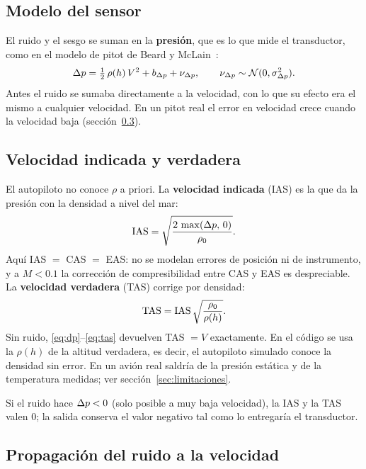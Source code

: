 \documentclass[11pt,a4paper]{article}
\begin{document}
\subsection{Modelo del sensor}

El ruido y el sesgo se suman en la \textbf{presión}, que es lo que mide el
transductor, como en el modelo de pitot de Beard y McLain~\cite{beard}:
\begin{equation}
  \Delta p = \tfrac12\,\rho(h)\,V^2 + b_{\Delta p} + \nu_{\Delta p},
  \qquad \nu_{\Delta p} \sim \mathcal{N}(0, \sigma_{\Delta p}^2).
  \label{eq:dp}
\end{equation}
Antes el ruido se sumaba directamente a la velocidad, con lo que su efecto era
el mismo a cualquier velocidad. En un pitot real el error en velocidad crece
cuando la velocidad baja (sección~\ref{sec:prop}).

\subsection{Velocidad indicada y verdadera}

El autopiloto no conoce $\rho$ a priori. La \textbf{velocidad indicada} (IAS)
es la que da la presión con la densidad a nivel del mar:
\begin{equation}
  \text{IAS} = \sqrt{\frac{2\,\max(\Delta p,\,0)}{\rho_0}} .
  \label{eq:ias}
\end{equation}
Aquí IAS $=$ CAS $=$ EAS: no se modelan errores de posición ni de instrumento,
y a $M < 0.1$ la corrección de compresibilidad entre CAS y EAS es despreciable.
La \textbf{velocidad verdadera} (TAS) corrige por densidad:
\begin{equation}
  \text{TAS} = \text{IAS}\,\sqrt{\frac{\rho_0}{\rho(h)}} .
  \label{eq:tas}
\end{equation}
Sin ruido, \eqref{eq:dp}--\eqref{eq:tas} devuelven TAS $= V$ exactamente.
En el código se usa la $\rho(h)$ de la altitud verdadera, es decir, el
autopiloto simulado conoce la densidad sin error. En un avión real saldría de
la presión estática y de la temperatura medidas; ver
sección~\ref{sec:limitaciones}.

Si el ruido hace $\Delta p < 0$ (solo posible a muy baja velocidad), la IAS y la
TAS valen 0; la salida  conserva el valor negativo
tal como lo entregaría el transductor.

\subsection{Propagación del ruido a la velocidad}
\label{sec:prop}
\end{document}
